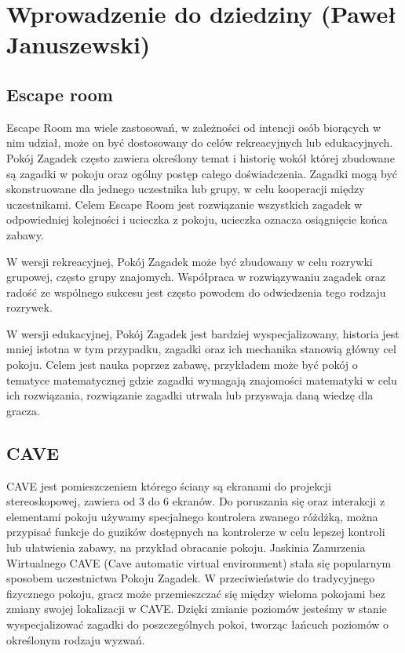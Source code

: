 \chapter{Wprowadzenie do dziedziny (Paweł Januszewski)}
\label{chap:field}

\section{Escape room}
Escape Room ma wiele zastosowań, w zależności od intencji osób biorących w nim udział, może on być dostosowany do celów rekreacyjnych lub edukacyjnych. Pokój Zagadek często zawiera określony temat i historię wokół której zbudowane są zagadki w pokoju oraz ogólny postęp całego doświadczenia. 
Zagadki mogą być skonstruowane dla jednego uczestnika lub grupy, w celu kooperacji między uczestnikami. Celem Escape Room jest rozwiązanie wszystkich zagadek w odpowiedniej kolejności i ucieczka z pokoju, ucieczka oznacza osiągnięcie końca zabawy.

W wersji rekreacyjnej, Pokój Zagadek może być zbudowany w celu rozrywki grupowej, często grupy znajomych. Współpraca w rozwiązywaniu zagadek oraz radość ze wspólnego sukcesu jest często powodem do odwiedzenia tego rodzaju rozrywek. 

W wersji edukacyjnej, Pokój Zagadek jest bardziej wyspecjalizowany, historia jest mniej istotna w tym przypadku, zagadki oraz ich mechanika stanowią główny cel pokoju.
Celem jest nauka poprzez zabawę, przykładem może być pokój o tematyce matematycznej gdzie zagadki wymagają znajomości matematyki w celu ich rozwiązania, rozwiązanie zagadki utrwala lub przyswaja daną wiedzę dla gracza.

\section{CAVE}
CAVE jest pomieszczeniem którego ściany są ekranami do projekcji stereoskopowej, zawiera od 3 do 6 ekranów. Do poruszania się oraz interakcji z elementami pokoju używamy specjalnego kontrolera zwanego różdżką, można przypisać funkcje do guzików dostępnych na kontrolerze w celu lepszej kontroli lub ułatwienia zabawy, na przykład obracanie pokoju.
Jaskinia Zanurzenia Wirtualnego CAVE (Cave automatic virtual environment) stała się popularnym sposobem uczestnictwa Pokoju Zagadek. W przeciwieństwie do tradycyjnego fizycznego pokoju, gracz może przemieszczać się między wieloma pokojami bez zmiany swojej lokalizacji w CAVE. Dzięki zmianie poziomów jesteśmy w stanie wyspecjalizować zagadki do poszczególnych pokoi, tworząc łańcuch poziomów o określonym rodzaju wyzwań.

